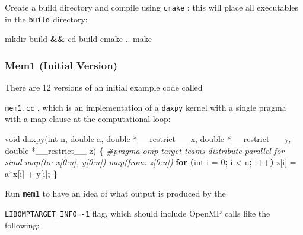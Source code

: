 \documentclass[
]{article}
\let\oldtexttt\texttt
\renewcommand{\texttt}[1]{
  \colorbox{Light}{\oldtexttt{#1}}
}
\newenvironment{Shaded}{}{}
\newcommand{\BuiltInTok}[1]{#1}
\newcommand{\CommentTok}[1]{\textcolor[rgb]{0.38,0.63,0.69}{\textit{#1}}}
\newcommand{\ExtensionTok}[1]{#1}
\newcommand{\FunctionTok}[1]{\textcolor[rgb]{0.02,0.16,0.49}{#1}}
\newcommand{\KeywordTok}[1]{\textcolor[rgb]{0.00,0.44,0.13}{\textbf{#1}}}
\newcommand{\NormalTok}[1]{#1}
\newcommand{\OperatorTok}[1]{\textcolor[rgb]{0.40,0.40,0.40}{#1}}
\begin{document}
Create a build directory and compile using \texttt{cmake}: this will
place all executables in the \texttt{build} directory:

\begin{Shaded}
\begin{Highlighting}[]
\FunctionTok{mkdir}\NormalTok{ build }\KeywordTok{\&\&} \BuiltInTok{cd}\NormalTok{ build}
\FunctionTok{cmake}\NormalTok{ ..}
\FunctionTok{make}
\end{Highlighting}
\end{Shaded}

\hypertarget{mem1-initial-version}{%
\subsubsection{Mem1 (Initial Version)}\label{mem1-initial-version}}

There are 12 versions of an initial example code called
\texttt{mem1.cc}, which is an implementation of a \texttt{daxpy} kernel
with a single pragma with a map clause at the computational loop:

\begin{Shaded}
\begin{Highlighting}[]
\ExtensionTok{void}\NormalTok{ daxpy(int n, double a, double *\_\_restrict\_\_ x, double *\_\_restrict\_\_ y, double *\_\_restrict\_\_ z)}
\KeywordTok{\{}
\CommentTok{\#pragma omp target teams distribute parallel for simd map(to: x[0:n], y[0:n]) map(from: z[0:n])}
        \KeywordTok{for} \KeywordTok{(}\ExtensionTok{int}\NormalTok{ i = 0}\KeywordTok{;} \ExtensionTok{i} \OperatorTok{\textless{}}\NormalTok{ n}\KeywordTok{;} \ExtensionTok{i++}\KeywordTok{)}
                \ExtensionTok{z}\NormalTok{[i] = a*x[i] + y[i]}\KeywordTok{;}
\KeywordTok{\}}
\end{Highlighting}
\end{Shaded}

Run \texttt{mem1} to have an idea of what output is produced by the
\texttt{LIBOMPTARGET\_INFO=-1} flag, which should include OpenMP calls
like the following:
\end{document}
